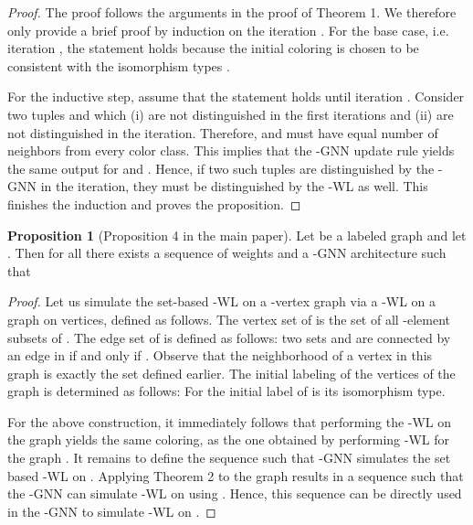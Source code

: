 \documentclass[letterpaper]{article}
\theoremstyle{definition}
\newtheorem{proposition}[theorem]{Proposition}
\begin{document}
\begin{proof}
	The proof follows the arguments in the proof of Theorem 1.
	We therefore only provide a brief proof by induction on the iteration . 
	For the base case, i.e. iteration , the statement holds because 
	the initial coloring  is chosen to be consistent with the 
	isomorphism types .
				
	For the inductive step, assume that the statement holds until iteration .
	Consider two tuples  and  
	which (i) are not distinguished in the first  iterations 
	and (ii) are not distinguished in the  iteration. 
	Therefore,  and  must have equal number of neighbors from 
	every color class. This implies that the -GNN update rule yields the same output for  and .
	Hence, if two such tuples are distinguished by the -GNN in the  iteration,
	they must be distinguished by the -WL as well. This finishes the induction and proves the proposition. 
\end{proof}

\begin{proposition}[Proposition 4 in the main paper]
	Let  be a labeled graph and let . Then for all  there exists a sequence of weights  and a -GNN architecture such that   
	
\end{proposition}


\begin{proof}
	Let us simulate the set-based -WL on a -vertex graph  
	via a -WL on a graph  on  vertices,
	defined as follows. The vertex set of  is the 
	set  of all -element subsets of . 
	The edge set of  is defined as follows: two 
	sets  and  are connected by an edge in  
	if and only if . Observe that the 
	neighborhood of a vertex  in this graph
	is exactly the set  defined earlier. 
	The initial labeling of the vertices of the graph  is determined as follows:
	For  the initial label of  is its isomorphism type.
				
	For the above construction, it immediately follows that 
	performing the -WL on the graph  yields the same 
	coloring, as the one obtained by performing -WL for the graph . It remains to define the sequence  such that -GNN simulates the set based -WL on . Applying Theorem 2 to the graph  results in a 
	sequence  such that the -GNN can simulate -WL on  using . 
	Hence, this sequence can be directly used in the -GNN to simulate -WL on . 
\end{proof}
\end{document}
